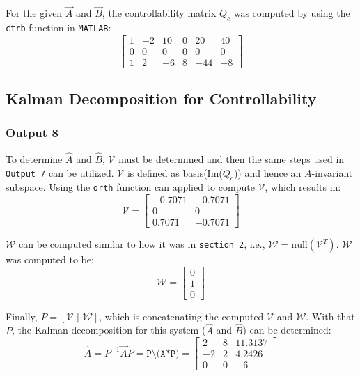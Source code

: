 \documentclass[10pt]{article}
\begin{document}
For the given $\vec{A}$ and $\vec{B}$, the controllability matrix $Q_c$ was computed by using the \texttt{ctrb} function in \texttt{MATLAB}:
\begin{equation*}
    \begin{bmatrix}
        1 & -2 & 10 & 0 & 20 & 40 \\
        0 & 0 & 0 & 0 & 0 & 0 \\
        1 & 2 & -6 & 8 & -44 & -8
    \end{bmatrix}
\end{equation*}

\subsection{Kalman Decomposition for Controllability}
\subsubsection{Output 8}
To determine $\hat{A}$ and $\hat{B}$, $\mathcal{V}$ must be determined and then the same steps used in \texttt{Output 7} can be utilized. $\mathcal{V}$ is defined as basis(Im($Q_c$)) and hence an $A$-invariant subspace. Using the \texttt{orth} function can applied to compute $\mathcal{V}$, which results in:
\begin{equation*}
    \mathcal{V} = \begin{bmatrix}
        -0.7071 & -0.7071 \\
        0 & 0 \\ 
        0.7071 & -0.7071
    \end{bmatrix}
\end{equation*}

$\mathcal{W}$ can be computed similar to how it was in \texttt{section 2}, i.e., $\mathcal{W} = \text{null}(\mathcal{V}^T)$. $\mathcal{W}$ was computed to be:
\begin{equation*}
    \mathcal{W} = 
        \begin{bmatrix}
            0\\1\\0
        \end{bmatrix}
\end{equation*}

Finally, $P = [\mathcal{V} \text{ | } \mathcal{W}]$, which is concatenating the computed $\mathcal{V}$ and $\mathcal{W}$. With that $P$, the Kalman decomposition for this system ($\hat{A}$ and $\hat{B}$) can be determined:
\begin{equation*}
    \hat{A} = P^{-1}\vec{A}P = \texttt{P\textbackslash(A*P)} = 
    \begin{bmatrix}
        2 & 8 & 11.3137 \\
        -2 & 2 & 4.2426 \\ 
        0 & 0 & -6
    \end{bmatrix}
\end{equation*}
\end{document}
